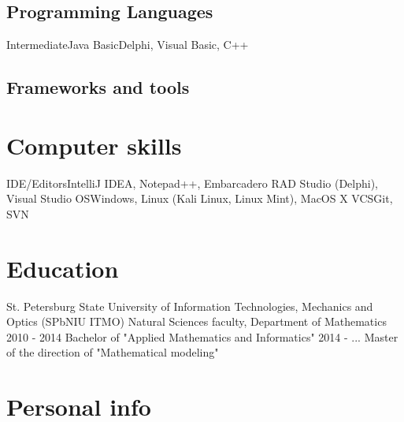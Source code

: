 \documentclass[11pt,a4paper,russian]{moderncv}
\begin{document}
\subsection{Programming Languages}
\cvline
  {Intermediate}{Java}
\cvline
  {Basic}{Delphi, Visual Basic, C++}
\subsection{Frameworks and tools}
\newpage

\section{Computer skills}
  \cvline
  {IDE/Editors}{IntelliJ IDEA, Notepad++, Embarcadero RAD Studio (Delphi), Visual Studio}
  \cvline
  {OS}{Windows, Linux (Kali Linux, Linux Mint), MacOS X}
  \cvline
  {VCS}{Git, SVN}

\section{Education}
  \cventry
    {}
    {\textnormal{St. Petersburg State University of Information Technologies, Mechanics and Optics (SPbNIU ITMO)}{}}
    {\textnormal{Natural Sciences faculty, Department of Mathematics}}
    {}{}{}
  \cventry
    {2010 - 2014}
    {\textnormal{Bachelor of "Applied Mathematics and Informatics"}}
    {}{}{}{}
  \cventry
    {2014 - ...}
    {\textnormal{Master of the direction of "Mathematical modeling"}}
    {}{}{}{}
\section{Personal info}
\end{document}
